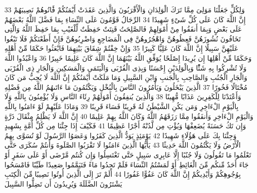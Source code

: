 \documentclass[20pt,a4paper]{article}
\begin{document}
{\tiny\colorbox{cl_aya}{33}} وَلِكُلٍّ جَعَلْنَا مَوَلِىَ مِمَّا تَرَكَ الْوَلِدَانِ وَالْأَقْرَبُونَ وَالَّذِينَ عَقَدَتْ أَيْمَنُكُمْ فََٔاتُوهُمْ نَصِيبَهُمْ إِنَّ اللَّهَ كَانَ عَلَى كُلِّ شَىْءٍ شَهِيدًا
{\tiny\colorbox{cl_aya}{34}} الرِّجَالُ قَوَّمُونَ عَلَى النِّسَاءِ بِمَا فَضَّلَ اللَّهُ بَعْضَهُمْ عَلَى بَعْضٍ وَبِمَا أَنفَقُوا مِنْ أَمْوَلِهِمْ فَالصَّلِحَتُ قَنِتَتٌ حَفِظَتٌ لِّلْغَيْبِ بِمَا حَفِظَ اللَّهُ وَالَّتِى تَخَافُونَ نُشُوزَهُنَّ فَعِظُوهُنَّ وَاهْجُرُوهُنَّ فِى الْمَضَاجِعِ وَاضْرِبُوهُنَّ فَإِنْ أَطَعْنَكُمْ فَلَا تَبْغُوا عَلَيْهِنَّ سَبِيلًا إِنَّ اللَّهَ كَانَ عَلِيًّا كَبِيرًا
{\tiny\colorbox{cl_aya}{35}} وَإِنْ خِفْتُمْ شِقَاقَ بَيْنِهِمَا فَابْعَثُوا حَكَمًا مِّنْ أَهْلِهِ وَحَكَمًا مِّنْ أَهْلِهَا إِن يُرِيدَا إِصْلَحًا يُوَفِّقِ اللَّهُ بَيْنَهُمَا إِنَّ اللَّهَ كَانَ عَلِيمًا خَبِيرًا
{\tiny\colorbox{cl_aya}{36}} وَاعْبُدُوا اللَّهَ وَلَا تُشْرِكُوا بِهِ شَئًْا وَبِالْوَلِدَيْنِ إِحْسَنًا وَبِذِى الْقُرْبَى وَالْيَتَمَى وَالْمَسَكِينِ وَالْجَارِ ذِى الْقُرْبَى وَالْجَارِ الْجُنُبِ وَالصَّاحِبِ بِالْجَنبِ وَابْنِ السَّبِيلِ وَمَا مَلَكَتْ أَيْمَنُكُمْ إِنَّ اللَّهَ لَا يُحِبُّ مَن كَانَ مُخْتَالًا فَخُورًا
{\tiny\colorbox{cl_aya}{37}} الَّذِينَ يَبْخَلُونَ وَيَأْمُرُونَ النَّاسَ بِالْبُخْلِ وَيَكْتُمُونَ مَا ءَاتَىهُمُ اللَّهُ مِن فَضْلِهِ وَأَعْتَدْنَا لِلْكَفِرِينَ عَذَابًا مُّهِينًا
{\tiny\colorbox{cl_aya}{38}} وَالَّذِينَ يُنفِقُونَ أَمْوَلَهُمْ رِئَاءَ النَّاسِ وَلَا يُؤْمِنُونَ بِاللَّهِ وَلَا بِالْيَوْمِ الْءَاخِرِ وَمَن يَكُنِ الشَّيْطَنُ لَهُ قَرِينًا فَسَاءَ قَرِينًا
{\tiny\colorbox{cl_aya}{39}} وَمَاذَا عَلَيْهِمْ لَوْ ءَامَنُوا بِاللَّهِ وَالْيَوْمِ الْءَاخِرِ وَأَنفَقُوا مِمَّا رَزَقَهُمُ اللَّهُ وَكَانَ اللَّهُ بِهِمْ عَلِيمًا
{\tiny\colorbox{cl_aya}{40}} إِنَّ اللَّهَ لَا يَظْلِمُ مِثْقَالَ ذَرَّةٍ وَإِن تَكُ حَسَنَةً يُضَعِفْهَا وَيُؤْتِ مِن لَّدُنْهُ أَجْرًا عَظِيمًا
{\tiny\colorbox{cl_aya}{41}} فَكَيْفَ إِذَا جِئْنَا مِن كُلِّ أُمَّةٍ بِشَهِيدٍ وَجِئْنَا بِكَ عَلَى هَؤُلَاءِ شَهِيدًا
{\tiny\colorbox{cl_aya}{42}} يَوْمَئِذٍ يَوَدُّ الَّذِينَ كَفَرُوا وَعَصَوُا الرَّسُولَ لَوْ تُسَوَّى بِهِمُ الْأَرْضُ وَلَا يَكْتُمُونَ اللَّهَ حَدِيثًا
{\tiny\colorbox{cl_aya}{43}} يَأَيُّهَا الَّذِينَ ءَامَنُوا لَا تَقْرَبُوا الصَّلَوةَ وَأَنتُمْ سُكَرَى حَتَّى تَعْلَمُوا مَا تَقُولُونَ وَلَا جُنُبًا إِلَّا عَابِرِى سَبِيلٍ حَتَّى تَغْتَسِلُوا وَإِن كُنتُم مَّرْضَى أَوْ عَلَى سَفَرٍ أَوْ جَاءَ أَحَدٌ مِّنكُم مِّنَ الْغَائِطِ أَوْ لَمَسْتُمُ النِّسَاءَ فَلَمْ تَجِدُوا مَاءً فَتَيَمَّمُوا صَعِيدًا طَيِّبًا فَامْسَحُوا بِوُجُوهِكُمْ وَأَيْدِيكُمْ إِنَّ اللَّهَ كَانَ عَفُوًّا غَفُورًا
{\tiny\colorbox{cl_aya}{44}} أَلَمْ تَرَ إِلَى الَّذِينَ أُوتُوا نَصِيبًا مِّنَ الْكِتَبِ يَشْتَرُونَ الضَّلَلَةَ وَيُرِيدُونَ أَن تَضِلُّوا السَّبِيلَ
\end{document}
